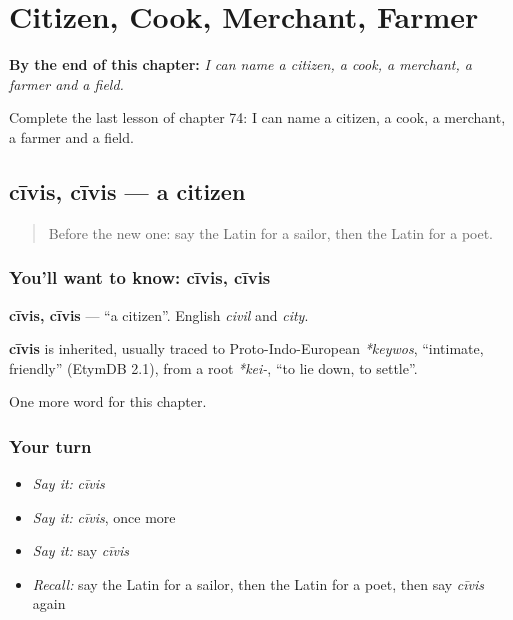 
\chapter{Citizen, Cook, Merchant, Farmer}
\label{ch:la-citizen-cook-merchant-farmer}

\begin{chapteropening}
\textbf{By the end of this chapter:} \emph{I can name a citizen, a cook, a merchant, a farmer and a field.}

Complete the last lesson of chapter 74: I can name a citizen, a cook, a merchant, a farmer and a field.
\end{chapteropening}

\section[cīvis, cīvis]{cīvis, cīvis — a citizen}

\label{lesson:LA-C74-civis}



\begin{quote}
Before the new one: say the Latin for a sailor, then the Latin for a poet.
\end{quote}

\subsection*{You'll want to know: cīvis, cīvis}
\textbf{cīvis, cīvis} — \textquotedblleft{}a citizen\textquotedblright{}. English \emph{civil} and \emph{city}.

\begin{cousinweb}
\textbf{cīvis} is inherited, usually traced to Proto-Indo-European \emph{*keywos}, \textquotedblleft{}intimate, friendly\textquotedblright{} (EtymDB 2.1), from a root \emph{*kei-}, \textquotedblleft{}to lie down, to settle\textquotedblright{}.
\end{cousinweb}

\begin{grammarlens}[title={What you've built}]
One more word for this chapter.
\end{grammarlens}

\subsection*{Your turn}
\begin{itemize}
\raggedright
  \item \emph{Say it:} \emph{cīvis}
  \item \emph{Say it:} \emph{cīvis}, once more
  \item \emph{Say it:} say \emph{cīvis}
  \item \emph{Recall:} say the Latin for a sailor, then the Latin for a poet, then say \emph{cīvis} again
\end{itemize}

